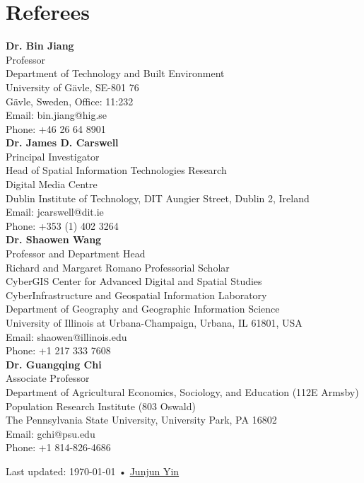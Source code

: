 \documentclass[11pt, a4paper]{article}
\begin{document}
\section*{Referees}
\noindent
\textbf{Dr. Bin Jiang}\\
Professor\\
Department of Technology and Built Environment\\
University of Gävle, SE-801 76\\
Gävle, Sweden, Office: 11:232\\
Email: bin.jiang@hig.se\\
Phone: +46 26 64 8901\\

\textbf{Dr. James D. Carswell}\\
Principal Investigator\\
Head of Spatial Information Technologies Research\\
Digital Media Centre\\
Dublin Institute of Technology, DIT Aungier Street, Dublin 2, Ireland\\
Email: jcarswell@dit.ie\\
Phone: +353 (1) 402 3264\\

\textbf{Dr. Shaowen Wang}\\
Professor and Department Head\\
Richard and Margaret Romano Professorial Scholar\\
CyberGIS Center for Advanced Digital and Spatial Studies\\
CyberInfrastructure and Geospatial Information Laboratory\\
Department of Geography and Geographic Information Science\\
University of Illinois at Urbana-Champaign, Urbana, IL 61801, USA\\
Email: shaowen@illinois.edu\\
Phone: +1 217 333 7608\\

\textbf{Dr. Guangqing Chi}\\
Associate Professor\\
Department of Agricultural Economics, Sociology, and Education (112E Armsby)\\
Population Research Institute (803 Oswald)\\
The Pennsylvania State University, University Park, PA 16802\\
Email: gchi@psu.edu\\
Phone: +1 814-826-4686
\vfill{}

\begin{center}
{\scriptsize  Last updated: \today\- •\- 
\href{https://yinjunjun.github.io/home/}{Junjun Yin}}
\end{center}
\end{document}
